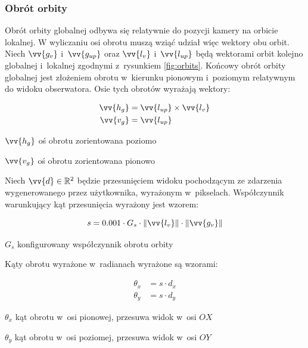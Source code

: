 \subsubsection{Obrót orbity}

Obrót orbity globalnej odbywa się relatywnie do pozycji kamery na orbicie lokalnej. W wyliczaniu osi obrotu muszą wziąć udział więc wektory obu orbit. Niech $\vv{g_{v}}$ i~$\vv{g_{up}}$ oraz $\vv{l_{v}}$ i~$\vv{l_{up}}$ będą wektorami orbit kolejno globalnej i~lokalnej zgodnymi z~rysunkiem \ref{fig:orbits}. Końcowy obrót orbity globalnej jest złożeniem obrotu w~kierunku pionowym i~poziomym relatywnym do widoku obserwatora. Osie tych obrotów wyrażają wektory:

\begin{samepage}
    \begin{align}
        \label{eq:o_1}
        \vv{h_g} &= \vv{l_{up}} \times \vv {l_{v}}\\
        \vv{v_g} &= \vv{l_{up}}
    \end{align}
    \begin{eqexpl}[25mm]
        \item {$\vv{h_g}$} oś obrotu zorientowana poziomo
        \item {$\vv{v_g}$} oś obrotu zorientowana pionowo
    \end{eqexpl}
    \vspace{\baselineskip}
\end{samepage}

Niech $\vv{d} \in \mathbb{R}^2 $ będzie przesunięciem widoku pochodzącym ze zdarzenia wygenerowanego przez użytkownika, wyrażonym w~pikselach. Współczynnik warunkujący kąt przesunięcia wyrażony jest wzorem:
\begin{samepage}
    \begin{equation}
        \label{eq:o_2}
        s = 0.001 \cdot G_s \cdot \Vert\vv{l_v}\Vert \cdot \Vert\vv{g_v}\Vert
    \end{equation}
    \begin{eqexpl}[25mm]
        \item {$G_s$} konfigurowany współczynnik obrotu orbity 
    \end{eqexpl}
    \vspace{\baselineskip}
\end{samepage}

Kąty obrotu wyrażone w~radianach wyrażone są wzorami:
\begin{samepage}
    \begin{align}
        \label{eq:o_3}
        \theta_x &= s \cdot d_x \\
        \theta_y &= s \cdot d_y
    \end{align}
    \begin{eqexpl}[25mm]
        \item {$\theta_x$} kąt obrotu w~osi pionowej, przesuwa widok w~osi $OX$
        \item {$\theta_y$} kąt obrotu w~osi poziomej, przesuwa widok w~osi $OY$
    \end{eqexpl}
    \vspace{\baselineskip}
\end{samepage}

